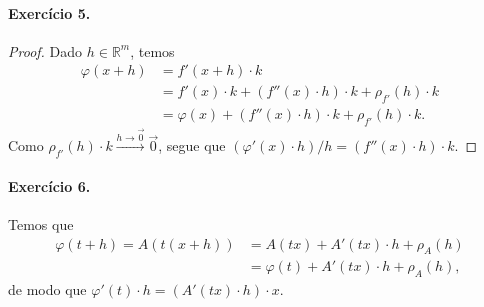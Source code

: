 \documentclass[12pt,a4paper]{article}
\newcommand{\R}{\mathbb{R}}
\begin{document}
\paragraph{Exercício 5.}
    \begin{proof}
        Dado $h\in\R^m$, temos
        \begin{align*}
            \varphi(x+h) &= f'(x+h)\cdot k \\
                         &= f'(x)\cdot k + (f''(x)\cdot h)\cdot k + \rho_{f'}(h)\cdot k \\
                         &= \varphi(x) + (f''(x)\cdot h)\cdot k + \rho_{f'}(h)\cdot k.
        \end{align*}
        Como $\rho_{f'}(h)\cdot k \xrightarrow{h\to \vec{0}} \vec{0}$, segue que $(\varphi'(x)\cdot h)/h 
        = (f''(x)\cdot h)\cdot k$.
    \end{proof}
\paragraph{Exercício 6.}
    Temos que
    \begin{align*}
        \varphi(t+h) = A(t(x+h)) &= A(tx) + A'(tx)\cdot h + \rho_A(h) \\
                                 &= \varphi(t) + A'(tx)\cdot h + \rho_A(h),
    \end{align*}
    de modo que $\varphi'(t)\cdot h = (A'(tx)\cdot h)\cdot x$.
\end{document}
